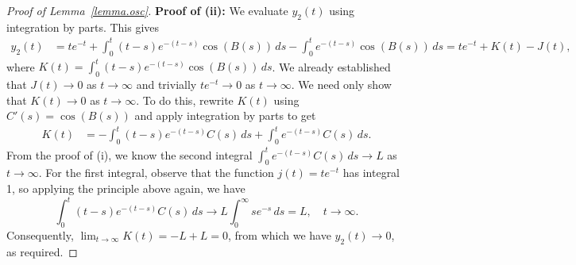 \documentclass[10pt,reqno]{amsart}
\theoremstyle{definition}
\begin{document}
\begin{proof}[Proof of Lemma~\ref{lemma.osc}]
	
	\textbf{Proof of (ii):} We evaluate $y_2(t)$ using integration by parts. This gives 
	\begin{align*}
		y_2(t)%
		&= t e^{-t} + \int_0^t (t-s)e^{-(t-s)}\cos(B(s)) \, ds - \int_0^t e^{-(t-s)}\cos(B(s)) \, ds %
		= t e^{-t} + K(t) - J(t),
	\end{align*}
	where $K(t) = \int_0^t (t-s)e^{-(t-s)}\cos(B(s)) \, ds$. We already established that $J(t) \to 0$ as $t\to\infty$ and trivially $t e^{-t} \to 0$ as $t\to\infty$. We need only show that $K(t) \to 0$ as $t\to\infty$. To do this, rewrite $K(t)$ using $C'(s) = \cos(B(s))$ and apply integration by parts to get %
	\begin{align*}
		K(t) %
		&= - \int_0^t (t-s)e^{-(t-s)}C(s) \, ds + \int_0^t e^{-(t-s)}C(s) \, ds.
	\end{align*}
	From the proof of (i), we know the second integral $\int_0^t e^{-(t-s)}C(s) \, ds \to L$ as $t\to\infty$. For the first integral, observe that the function $j(t)=te^{-t}$ has integral 1, so applying the principle above again, we have 
	\[
	\int_0^t (t-s) e^{-(t-s)} C(s)\,ds \to L\int_0^\infty s e^{-s}\,ds = L, \quad t\to\infty.
	\]
	Consequently, $\lim_{t \to \infty} K(t) = -L + L = 0$, from which we have $y_2(t)\to 0$, as required. 
\end{proof}
\end{document}
